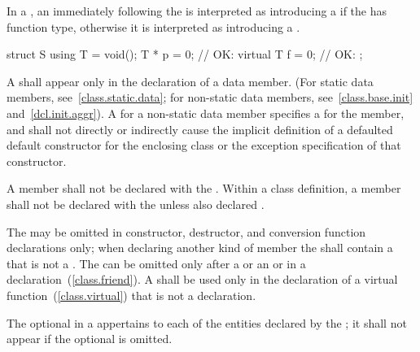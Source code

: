 \pnum
In a ,
an \tcode{=} immediately following the 
is interpreted as introducing a 
if the  has function type,
otherwise it is interpreted as introducing
a .
\begin{example}
\begin{codeblock}
struct S {
  using T = void();
  T * p = 0;        // OK: 
  virtual T f = 0;  // OK: 
};
\end{codeblock}
\end{example}

\pnum
A  shall appear only in the
declaration of a data member. (For static data members,
see~\ref{class.static.data}; for non-static data members,
see~\ref{class.base.init} and~\ref{dcl.init.aggr}).
A  for a non-static data member
%
specifies a  for the member, and
shall not directly or indirectly cause the implicit definition of a
defaulted default constructor for the enclosing class or the
exception specification of that constructor.

\pnum
A member shall not be declared with the 
. Within a class definition, a member shall not be declared with the   unless also declared .

\pnum
The  may be omitted in constructor, destructor,
and conversion function declarations only;
when declaring another kind of member the 
shall contain a  that is not a .
The
 can be omitted only after a
 or an  or in a
 declaration~(\ref{class.friend}). A
 shall be used only in the declaration of a
virtual function~(\ref{class.virtual})
that is not a  declaration.

\pnum
The optional  in a 
appertains to each of the entities declared by the ;
it shall not appear if the optional  is omitted.

